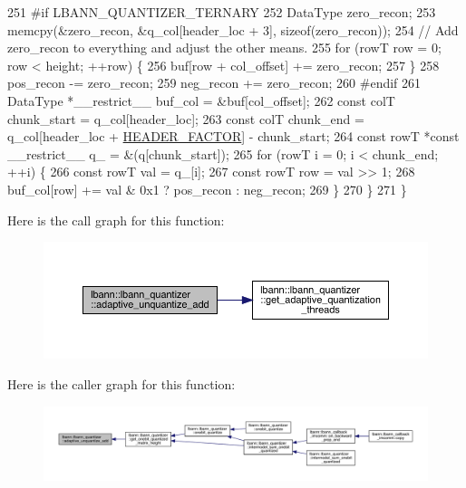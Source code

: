 \begin{DoxyCode}
251 \textcolor{preprocessor}{#if LBANN\_QUANTIZER\_TERNARY}
252     DataType zero\_recon;
253     memcpy(&zero\_recon, &q\_col[header\_loc + 3], \textcolor{keyword}{sizeof}(zero\_recon));
254     \textcolor{comment}{// Add zero\_recon to everything and adjust the other means.}
255     \textcolor{keywordflow}{for} (rowT row = 0; row < height; ++row) \{
256       buf[row + col\_offset] += zero\_recon;
257     \}
258     pos\_recon -= zero\_recon;
259     neg\_recon += zero\_recon;
260 \textcolor{preprocessor}{#endif}
261     DataType *\_\_restrict\_\_ buf\_col = &buf[col\_offset];
262     \textcolor{keyword}{const} colT chunk\_start = q\_col[header\_loc];
263     \textcolor{keyword}{const} colT chunk\_end = q\_col[header\_loc + \hyperlink{classlbann_1_1lbann__quantizer_afb4315625e371169cabfac56c3f75d37}{HEADER\_FACTOR}] - chunk\_start;
264     \textcolor{keyword}{const} rowT *\textcolor{keyword}{const} \_\_restrict\_\_ q\_ = &(q[chunk\_start]);
265     \textcolor{keywordflow}{for} (rowT i = 0; i < chunk\_end; ++i) \{
266       \textcolor{keyword}{const} rowT val = q\_[i];
267       \textcolor{keyword}{const} rowT row = val >> 1;
268       buf\_col[row] += val & 0x1 ? pos\_recon : neg\_recon;
269     \}
270   \}
271 \}
\end{DoxyCode}
Here is the call graph for this function\+:\nopagebreak
\begin{figure}[H]
\begin{center}
\leavevmode
\includegraphics[width=350pt]{classlbann_1_1lbann__quantizer_a1f63f7be2e227a48ebaa25056e6f85bc_cgraph}
\end{center}
\end{figure}
Here is the caller graph for this function\+:\nopagebreak
\begin{figure}[H]
\begin{center}
\leavevmode
\includegraphics[width=350pt]{classlbann_1_1lbann__quantizer_a1f63f7be2e227a48ebaa25056e6f85bc_icgraph}
\end{center}
\end{figure}
\mbox{\label{classlbann_1_1lbann__quantizer_af77beca5905ff8601ca9b8231a2a16e0}} 

